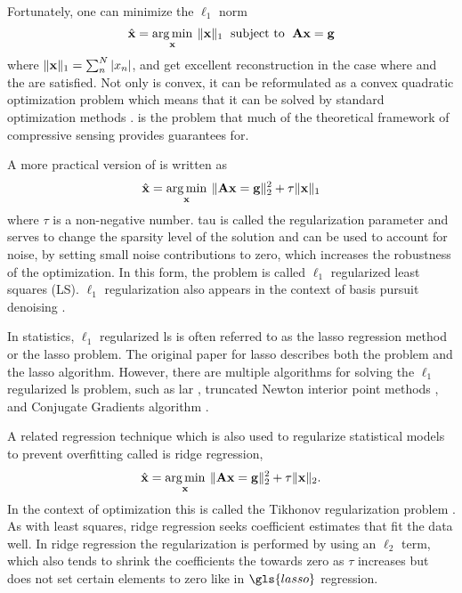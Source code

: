 Fortunately, one can minimize the $\ell_1$ norm 
\begin{equation}
	\hat{ \mathbf{x} } = \operatorname*{arg\,min}_{\mathbf{x}} \: \| \mathbf{x} \|_{1} \text{\; subject to \;} \mathbf{A}\mathbf{x} = \mathbf{g}
	\label{eq:l1min}
\end{equation}
where $\| \mathbf{x} \|_1 = \sum_{n}^{N}|x_n|$, and get excellent reconstruction in the case where  and the  are satisfied. Not only is  convex, it can be reformulated as a convex quadratic optimization problem which means that it can be solved by standard optimization methods \cite{donoho2006compressed, candes2006robust, foucart2013mathematical}.  is the problem that much of the theoretical framework of \gls{compressive sensing} provides guarantees for. 

A more practical version of  is written as
%
\begin{equation}
	\hat{ \mathbf{x} } = \operatorname*{arg\,min}_{\mathbf{x}} \: \| \mathbf{Ax} = \mathbf{g} \|_{2}^{2} + \tau \| \mathbf{x} \|_1
	\label{eq:l1regls}
\end{equation}
%
where $\tau$ is a non-negative number. \gls{tau} is called the regularization parameter and serves to change the sparsity level of the solution and can be used to account for noise, by setting small noise contributions to zero, which increases the robustness of the optimization. In this form, the problem is called $\ell_1$ regularized least squares (LS). $\ell_1$ regularization also appears in the context of basis pursuit denoising \cite{chen2001atomic}. 

In statistics, $\ell_1$ regularized \gls{ls} is often referred to as the \gls{lasso} regression method or the \gls{lasso} problem. The original paper for \gls{lasso} describes both the problem and the \gls{lasso} algorithm. However, there are multiple algorithms for solving the $\ell_1$ regularized \gls{ls} problem, such as \gls{lar} \cite{efron2004least}, truncated Newton interior point methods \cite{kim2007interior}, and Conjugate Gradients algorithm \cite{candes2005l1}. 

A related regression technique which is also used to regularize statistical models to prevent overfitting called is \gls{ridge regression},
%
\begin{equation}
	\hat{ \mathbf{x} } = \operatorname*{arg\,min}_{\mathbf{x}} \: \| \mathbf{Ax} = \mathbf{g} \|_{2}^{2} + \tau \| \mathbf{x} \|_2.
	\label{eq:l2regls}
\end{equation}
%
In the context of optimization this is called the Tikhonov regularization problem \cite{kim2007interior, neumaier1998solving}.  As with least squares, \gls{ridge regression} seeks coefficient estimates that fit the data well. In \gls{ridge regression} the regularization is performed by using an $\ell_2$ term, which also tends to shrink the coefficients the towards zero as $\tau$ increases but does not set certain elements to zero like in $\gls{lasso}$ regression. 

